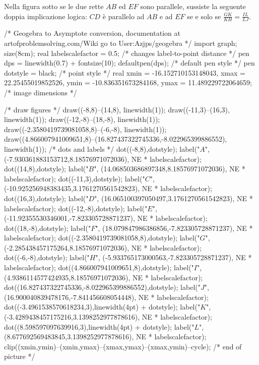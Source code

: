 \documentclass[11pt]{scrartcl}
\begin{document}
	\begin{theorem}[Talete]
		\label{talete}
		Nella figura sotto se le due rette $AB$ ed $EF$ sono parallele, sussiste la seguente doppia implicazione logica:
		$CD$ è parallelo ad $AB$ e ad $EF$ se e solo se $\frac{GK}{KH}=\frac{IL}{LJ}$.
		\begin{center}
			\begin{asy}
			/* Geogebra to Asymptote conversion, documentation at artofproblemsolving.com/Wiki go to User:Azjps/geogebra */
			import graph; size(8cm); 
			real labelscalefactor = 0.5; /* changes label-to-point distance */
			pen dps = linewidth(0.7) + fontsize(10); defaultpen(dps); /* default pen style */ 
			pen dotstyle = black; /* point style */ 
			real xmin = -16.152710153148043, xmax = 22.25455019852526, ymin = -10.836351673284168, ymax = 11.489229722064659;  /* image dimensions */
			
			/* draw figures */
			draw((-8,8)--(14,8), linewidth(1)); 
			draw((-11,3)--(16,3), linewidth(1)); 
			draw((-12,-8)--(18,-8), linewidth(1)); 
			draw((-2.3580419739081058,8)--(-6,-8), linewidth(1)); 
			draw((4.866007941009651,8)--(16.827437322745336,-8.022965399886552), linewidth(1)); 
			/* dots and labels */
			dot((-8,8),dotstyle); 
			label("$A$", (-7.930361883153712,8.18576971072036), NE * labelscalefactor); 
			dot((14,8),dotstyle); 
			label("$B$", (14.068503686897348,8.18576971072036), NE * labelscalefactor); 
			dot((-11,3),dotstyle); 
			label("$C$", (-10.925256948383435,3.1761270561542823), NE * labelscalefactor); 
			dot((16,3),dotstyle); 
			label("$D$", (16.065100397050497,3.1761270561542823), NE * labelscalefactor); 
			dot((-12,-8),dotstyle); 
			label("$E$", (-11.92355530346001,-7.823305728871237), NE * labelscalefactor); 
			dot((18,-8),dotstyle); 
			label("$F$", (18.079847986386856,-7.823305728871237), NE * labelscalefactor); 
			dot((-2.3580419739081058,8),dotstyle); 
			label("$G$", (-2.285438457175264,8.18576971072036), NE * labelscalefactor); 
			dot((-6,-8),dotstyle); 
			label("$H$", (-5.933765173000563,-7.823305728871237), NE * labelscalefactor); 
			dot((4.866007941009651,8),dotstyle); 
			label("$I$", (4.9386114577424935,8.18576971072036), NE * labelscalefactor); 
			dot((16.827437322745336,-8.022965399886552),dotstyle); 
			label("$J$", (16.900040839478176,-7.841456608054448), NE * labelscalefactor); 
			dot((-3.4961538570618234,3),linewidth(4pt) + dotstyle); 
			label("$K$", (-3.4289438457175216,3.1398252977878616), NE * labelscalefactor); 
			dot((8.598597097639916,3),linewidth(4pt) + dotstyle); 
			label("$L$", (8.677692569483845,3.1398252977878616), NE * labelscalefactor); 
			clip((xmin,ymin)--(xmin,ymax)--(xmax,ymax)--(xmax,ymin)--cycle); 
			/* end of picture */
			\end{asy}
		\end{center}
	\end{theorem}
\end{document}

